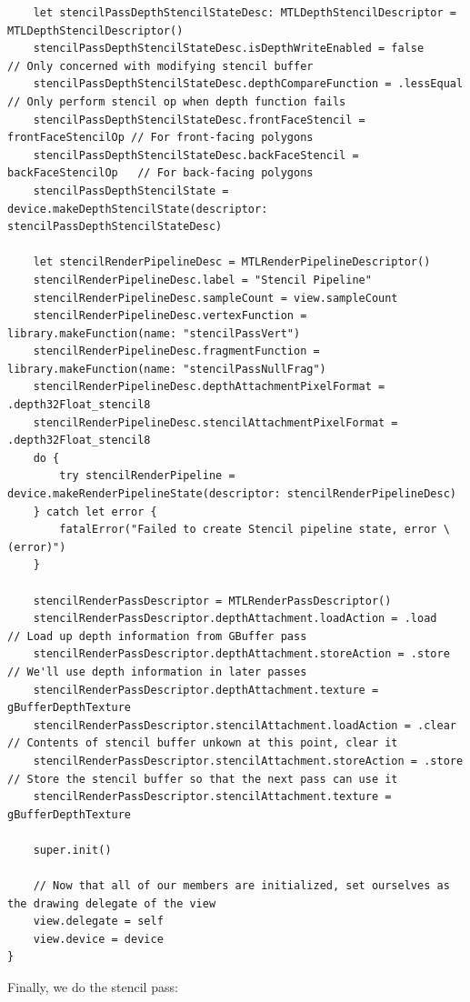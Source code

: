 \documentclass[11pt]{article}
\begin{document}
\begin{verbatim}
    let stencilPassDepthStencilStateDesc: MTLDepthStencilDescriptor = MTLDepthStencilDescriptor()
    stencilPassDepthStencilStateDesc.isDepthWriteEnabled = false           // Only concerned with modifying stencil buffer
    stencilPassDepthStencilStateDesc.depthCompareFunction = .lessEqual     // Only perform stencil op when depth function fails
    stencilPassDepthStencilStateDesc.frontFaceStencil = frontFaceStencilOp // For front-facing polygons
    stencilPassDepthStencilStateDesc.backFaceStencil = backFaceStencilOp   // For back-facing polygons
    stencilPassDepthStencilState = device.makeDepthStencilState(descriptor: stencilPassDepthStencilStateDesc)

    let stencilRenderPipelineDesc = MTLRenderPipelineDescriptor()
    stencilRenderPipelineDesc.label = "Stencil Pipeline"
    stencilRenderPipelineDesc.sampleCount = view.sampleCount
    stencilRenderPipelineDesc.vertexFunction = library.makeFunction(name: "stencilPassVert")
    stencilRenderPipelineDesc.fragmentFunction = library.makeFunction(name: "stencilPassNullFrag")
    stencilRenderPipelineDesc.depthAttachmentPixelFormat = .depth32Float_stencil8
    stencilRenderPipelineDesc.stencilAttachmentPixelFormat = .depth32Float_stencil8
    do {
        try stencilRenderPipeline = device.makeRenderPipelineState(descriptor: stencilRenderPipelineDesc)
    } catch let error {
        fatalError("Failed to create Stencil pipeline state, error \(error)")
    }

    stencilRenderPassDescriptor = MTLRenderPassDescriptor()
    stencilRenderPassDescriptor.depthAttachment.loadAction = .load      // Load up depth information from GBuffer pass
    stencilRenderPassDescriptor.depthAttachment.storeAction = .store    // We'll use depth information in later passes
    stencilRenderPassDescriptor.depthAttachment.texture = gBufferDepthTexture
    stencilRenderPassDescriptor.stencilAttachment.loadAction = .clear   // Contents of stencil buffer unkown at this point, clear it
    stencilRenderPassDescriptor.stencilAttachment.storeAction = .store  // Store the stencil buffer so that the next pass can use it
    stencilRenderPassDescriptor.stencilAttachment.texture = gBufferDepthTexture

    super.init()

    // Now that all of our members are initialized, set ourselves as the drawing delegate of the view
    view.delegate = self
    view.device = device
}
\end{verbatim}

Finally, we do the stencil pass:
\end{document}
